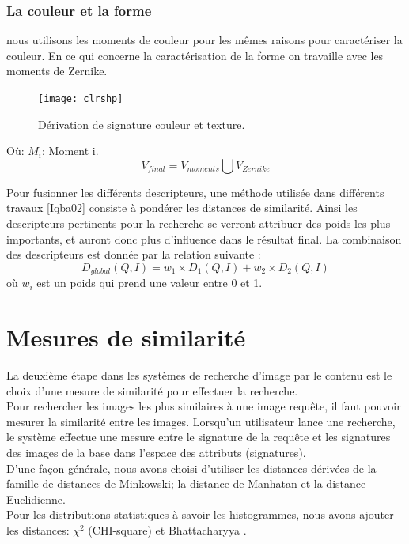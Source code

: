 \subsubsection{La couleur et la forme}
nous utilisons les moments de couleur pour les mêmes raisons pour caractériser la couleur. En ce qui concerne la caractérisation de la forme on travaille avec les moments de Zernike.
\begin{figure}[H]
	\centering
	\texttt{[image: clrshp]}
	\caption{Dérivation de signature couleur et texture.}
\end{figure}
Où: 
$ M_i $: Moment i.
\begin{equation}
V_{final} = V_{moments} \bigcup V_{Zernike}
\end{equation}

Pour fusionner les différents descripteurs, une méthode utilisée dans différents travaux [Iqba02] consiste à pondérer les distances de similarité. Ainsi les descripteurs pertinents pour la recherche se verront attribuer des poids les plus importants, et auront donc plus d’influence dans le résultat final. La combinaison des descripteurs est donnée par la relation suivante :
\begin{equation}
	D_{global}(Q, I) = w_1 \times 	D_{1}(Q, I) + w_2 \times 	D_{2}(Q, I)
\end{equation}
où $ w_i $ est un poids qui prend une valeur entre 0 et 1.
\section{Mesures de similarité}
La deuxième étape dans les systèmes de recherche d'image par le contenu est le choix d'une mesure de similarité pour effectuer la recherche.\\

Pour rechercher les images les plus similaires à une image requête, il faut pouvoir mesurer la similarité entre les images. Lorsqu’un utilisateur lance une recherche, le système effectue une mesure entre le signature de la requête et les signatures des images de la base dans l’espace des attributs (signatures).\\

D'une façon générale, nous avons choisi d’utiliser les distances dérivées de la famille de distances de Minkowski; la distance de Manhatan et la distance Euclidienne.\\

Pour les distributions statistiques à savoir les histogrammes, nous avons ajouter les distances:  $\chi^2$ (CHI-square) et Bhattacharyya  .

